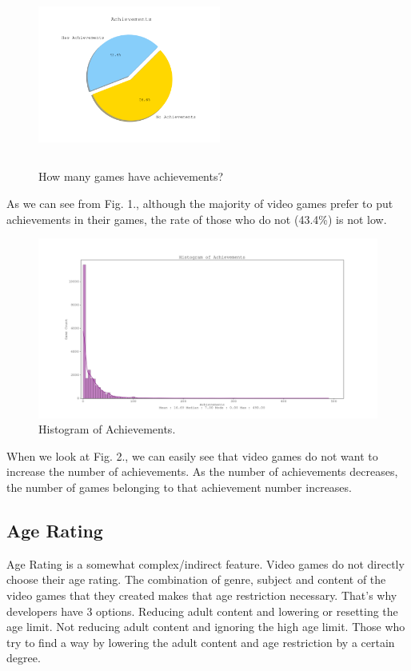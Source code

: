 \documentclass[conference]{IEEEtran}
\begin{document}
\begin{figure}[ht]
  \centering
  \includegraphics[width=6cm,height=6cm,keepaspectratio]{assets/achievements_pie.png}
  \caption{How many games have achievements?}
  \label{fig:achievements1}
\end{figure}

As we can see from Fig. 1., although the majority of video games prefer to put achievements in their games, the rate of those who do not (43.4\%) is not low.

\begin{figure}[ht]
  \centering
  \includegraphics[width=\linewidth]{assets/achievements_hist.png}
  \caption{Histogram of Achievements.}
  \label{fig:achievements2}
\end{figure}

When we look at Fig. 2., we can easily see that video games do not want to increase the number of achievements. As the number of achievements decreases, the number of games belonging to that achievement number increases.

\subsection{Age Rating}
Age Rating is a somewhat complex/indirect feature. Video games do not directly choose their age rating. The combination of genre, subject  and content of the video games that they created makes that age restriction necessary. That's why developers have 3 options. Reducing adult content and lowering or resetting the age limit. Not reducing adult content and ignoring the high age limit. Those who try to find a way by lowering the adult content and age restriction by a certain degree.
\end{document}
